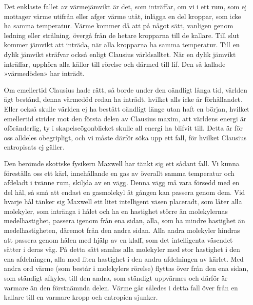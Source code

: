 \documentclass[a4paper, 12pt, oneside, swedish]{article}
\begin{document}
Det enklaste fallet av värmejämvikt är det, som inträffar, om vi i ett rum, som ej mottager värme utifrån eller afger värme utåt, inlägga en del kroppar, som icke ha samma temperatur. Värme kommer då att på något sätt, vanligen genom ledning eller strålning, övergå från de hetare kropparna till de kallare. Till slut kommer jämvikt att inträda, när alla kropparna ha samma temperatur. Till en dylik jämvikt sträfvar också enligt Clausius världsalltet. När en dylik jämvikt inträffar, upphöra alla källor till rörelse och därmed till lif. Den så kallade »värmedöden» har inträdt.

Om emellertid Clausius hade rätt, så borde under den oändligt långa tid, världen ägt bestånd, denna värmedöd redan ha inträdt, hvilket alls icke är förhållandet. Eller också skulle världen ej ha bestått oändligt länge utan haft en början, hvilket emellertid strider mot den första delen av Clausius maxim, att världens energi är oföränderlig, ty i skapelseögonblicket skulle all energi ha blifvit till. Detta är för oss alldeles obegripligt, och vi måste därför söka upp ett fall, för hvilket Clausius entropisats ej gäller.

Den berömde skottske fysikern Maxwell har tänkt sig ett sådant fall. Vi kunna föreställa oss ett kärl, innehållande en gas av överallt samma temperatur och afdeladt i tvänne rum, skiljda av en vägg. Denna vägg må vara försedd med en del hål, så små att endast en gasmolekyl åt gången kan passera genom dem. Vid hvarje hål tänker sig Maxwell ett litet intelligent väsen placeradt, som låter alla molekyler, som intränga i hålet och ha en hastighet större än molekylernas medelhastighet, passera igenom från ena sidan, alla, som ha mindre hastighet än medelhastigheten, däremot från den andra sidan. Alla andra molekyler hindras att passera genom hålen med hjälp av en klaff, som det intelligenta väsendet sätter i deras väg. På detta sätt samlas alla molekyler med stor hastighet i den ena afdelningen, alla med liten hastighet i den andra afdelningen av kärlet. Med andra ord värme (som består i molekylers rörelse) flyttas över från den ena sidan, som ständigt afkyles, till den andra, som ständigt uppvärmes och därför är varmare än den förstnämnda delen. Värme går således i detta fall över från en kallare till en varmare kropp och entropien sjunker.
\end{document}
